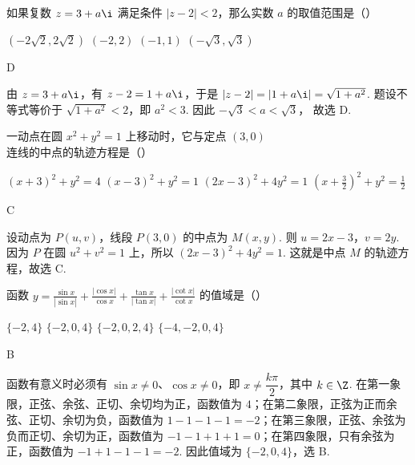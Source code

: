 \documentclass[UTF8,a4paper,oneside,11pt]{ctexbook}
\begin{document}
\begin{problem}
如果复数 \(z=3+a\i\) 满足条件 \(\left| z-2 \right|<2\)，那么实数 \(a\) 的取值范围是（\quad）

\choices
    {\((-2\sqrt{2}, 2\sqrt{2})\)}
    {\((-2,2)\)}
    {\((-1,1)\)}
    {\((-\sqrt{3}, \sqrt{3})\)}
\end{problem}

\begin{answer}
D
\end{answer}

\begin{solution}
由 \(z=3+a\i\)，有 \(z-2=1+a\i\)，于是
\(|z-2|=|1+a\i|=\sqrt{1+a^2}\).
题设不等式等价于 \(\sqrt{1+a^2}<2\)，即 \(a^2<3\). 因此
\(-\sqrt{3}<a<\sqrt{3}\)，
故选 D.
\end{solution}

\begin{problem}
一动点在圆 \(x^2+y^2=1\) 上移动时，它与定点 \((3,0)\) 连线的中点的轨迹方程是（\quad）

\choices
    {\((x+3)^2+y^2=4\)}
    {\((x-3)^2+y^2=1\)}
    {\((2x-3)^2+4y^2=1\)}
    {\(\left( x+\frac{3}{2} \right)^2+y^2=\frac{1}{2}\)}
\end{problem}

\begin{answer}
C
\end{answer}

\begin{solution}
设动点为 \(P(u,v)\)，线段 \(P(3,0)\) 的中点为 \(M(x,y)\). 则
\(u=2x-3\)，\(v=2y\). 因为 \(P\) 在圆 \(u^2+v^2=1\) 上，所以 \((2x-3)^2+4y^2=1\).
这就是中点 \(M\) 的轨迹方程，故选 C.
\end{solution}

\begin{problem}
函数 \(y=\frac{\sin x}{|\sin x|}+\frac{|\cos x|}{\cos x}+\frac{\tan x}{|\tan x|}+\frac{|\cot x|}{\cot x}\) 的值域是（\quad）

\choices
    {\(\{-2,4\}\)}
    {\(\{-2,0,4\}\)}
    {\(\{-2,0,2,4\}\)}
    {\(\{-4,-2,0,4\}\)}
\end{problem}

\begin{answer}
B
\end{answer}

\begin{solution}
函数有意义时必须有 \(\sin x\ne0\)、\(\cos x\ne0\)，即 \(x\ne\dfrac{k\pi}{2}\)，其中 \(k\in\Z\). 在第一象限，正弦、余弦、正切、余切均为正，函数值为 \(4\)；在第二象限，正弦为正而余弦、正切、余切为负，函数值为 \(1-1-1-1=-2\)；在第三象限，正弦、余弦为负而正切、余切为正，函数值为 \(-1-1+1+1=0\)；在第四象限，只有余弦为正，函数值为 \(-1+1-1-1=-2\). 因此值域为 \(\{-2,0,4\}\)，选 B.
\end{solution}
\end{document}
